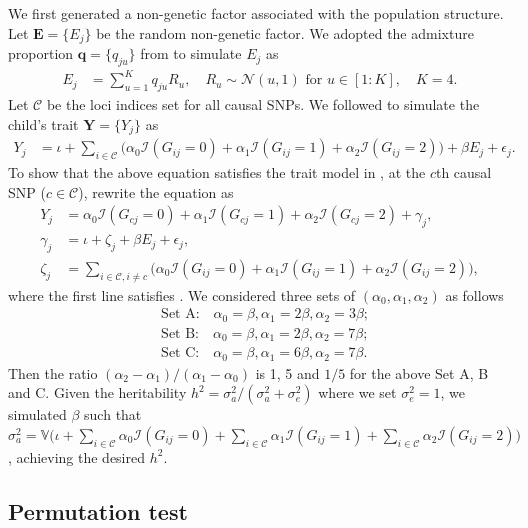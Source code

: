 \documentclass[12pt]{extarticle}
\newcommand{\indicator}{\mathcal{I}}
\newcommand{\intercept}{\iota}
\newcommand{\V}{\mathbb{V}}
\newcommand{\cC}{\mathcal{C}}
\begin{document}
{{We first generated a non-genetic factor associated with the population structure. Let $\boldsymbol{E}=\{E_j\}$ be the random non-genetic factor. We adopted the admixture proportion $\boldsymbol{q}=\{q_{ju}\}$ from  to simulate $E_j$ as 
\begin{align*}E_j &= \sum_{u=1}^K q_{ju}R_u,\quad R_u \sim \mathcal{N}(u,1) \text{ for }u \in [1:K], \quad K=4.
\end{align*} Let $\cC$ be the loci indices set for all causal SNPs. We followed   to simulate the child's trait $\boldsymbol{Y}=\{Y_j\}$ as
\begin{align*} 
Y_j &= \intercept + \sum_{i\in \cC}\Big( \alpha_0\indicator(G_{ij}=0) + \alpha_1\indicator(G_{ij}=1) + \alpha_2\indicator(G_{ij}=2) \Big)+\beta E_j+\epsilon_j.
\end{align*} To show that the above equation satisfies the trait model in , at the $c$th causal SNP ($c\in \cC$), rewrite the equation as
\begin{align*}Y_j &= \alpha_0\indicator(G_{cj}=0) + \alpha_1 \indicator(G_{cj}=1) + \alpha_2 \indicator(G_{cj}=2) + \gamma_j, \\
\gamma_j &= \intercept + \zeta_j + \beta E_j + \epsilon_j, \nonumber \\
\zeta_j &= \sum_{i\in \cC,i\neq c}\Big( \alpha_0\indicator(G_{ij}=0) + \alpha_1\indicator(G_{ij}=1) + \alpha_2\indicator(G_{ij}=2) \Big),
\end{align*}
where the first line satisfies . We considered three sets of $(\alpha_0,\alpha_1,\alpha_2)$ as follows 
\begin{align*}& \text{Set A:} \quad \alpha_0=\beta, \alpha_1=2\beta, \alpha_2=3\beta; \nonumber \\
& \text{Set B:} \quad \alpha_0=\beta, \alpha_1=2\beta, \alpha_2=7\beta; \nonumber \\
& \text{Set C:} \quad \alpha_0=\beta, \alpha_1=6\beta, \alpha_2=7\beta.
\end{align*}Then the ratio $(\alpha_2-\alpha_1)/(\alpha_1-\alpha_0)$ is 1, 5 and $1/5$ for the above Set A, B and C. Given the heritability $h^2=\sigma_a^2/(\sigma_a^2+\sigma_e^2)$ where we set $\sigma_e^2=1$, we simulated $\beta$ such that $\sigma^2_a=\V\Big(\intercept +\sum_{i\in \cC}\alpha_0 \indicator(G_{ij}=0) + \sum_{i\in \cC}\alpha_1 \indicator(G_{ij}=1) + \sum_{i\in \cC}\alpha_2\indicator(G_{ij}=2)\Big)$, achieving the desired $h^2$. 

\subsection{Permutation test} \label{app:permutation_test}

}}
\end{document}
